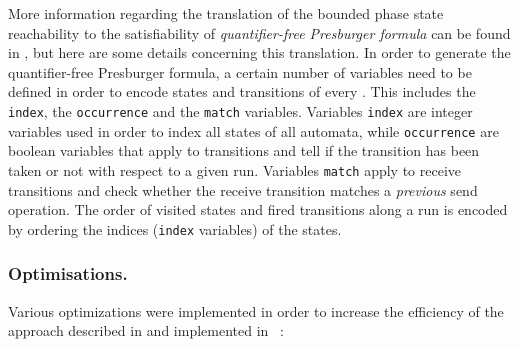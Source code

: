 More information regarding the translation of the bounded phase state reachability to the satisfiability of \emph{quantifier-free Presburger formula} can be found in \cite{AAC13}, but here are some details concerning this translation.
%
In order to generate the quantifier-free Presburger formula,
a certain number of variables need to be defined in order to encode states and transitions of every \Nfa.
%
This includes the \texttt{index}, the \texttt{occurrence} and the \texttt{match} variables.
%
Variables \texttt{index} are integer variables used in order to index all states of all automata,
while \texttt{occurrence} are boolean variables that apply to transitions and tell if the transition has been taken or not with respect to a given run.
%
Variables \texttt{match} apply to receive transitions and check whether the receive transition matches a \textit{previous} send operation.
%
The order of visited states and fired transitions  along a run is encoded by ordering the indices (\texttt{index} variables) of the states.


\subsubsection*{Optimisations.}
Various optimizations were implemented in order to increase the efficiency of the approach described in  \cite{AAC13} and implemented in \alternator\ \cite{github.alternator}:

